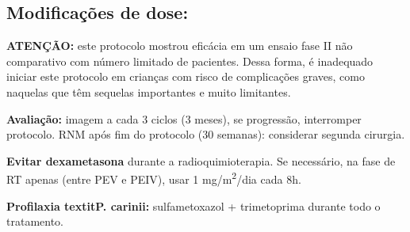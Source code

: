 \documentclass[11pt,a4paper,oldfontcommands]{memoir}
\begin{document}
\subsection{Modificações de dose:}
\textbf{ATENÇÃO:} este protocolo mostrou eficácia em um ensaio fase II não comparativo com número limitado de pacientes. Dessa forma, é inadequado iniciar este protocolo em crianças com risco de complicações graves, como naquelas que têm sequelas importantes e muito limitantes.

\textbf{Avaliação:} imagem a cada 3 ciclos (3 meses), se progressão, interromper protocolo. RNM após fim do protocolo (30 semanas): considerar segunda cirurgia.

\textbf{Evitar dexametasona} durante a radioquimioterapia. Se necessário, na fase de RT apenas (entre PEV e PEIV), usar 1 mg/m\textsuperscript{2}/dia cada 8h.

\textbf{Profilaxia textit{P. carinii:}} sulfametoxazol + trimetoprima durante todo o tratamento.
\end{document}
